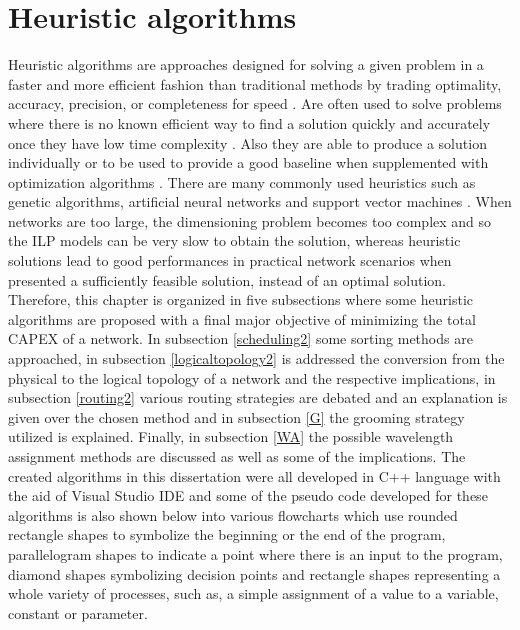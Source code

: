 \chapter{Heuristic algorithms}
\label{chapter5}

Heuristic algorithms are approaches designed for solving a given problem in a faster and more efficient fashion than traditional methods by trading optimality, accuracy, precision, or completeness for speed \cite{HeuristicsDefinition}. Are often used to solve problems where there is no known efficient way to find a solution quickly and accurately once they have low time complexity \cite{HeuristicsDefinition}. Also they are able to produce a solution individually or to be used to provide a good baseline when supplemented with optimization algorithms \cite{articleHeuristics}. There are many commonly used heuristics such as genetic algorithms, artificial neural networks and support vector machines \cite{HeuristicsDefinition}. When networks are too large, the dimensioning problem becomes too complex and so the ILP models can be very slow to obtain the solution, whereas heuristic solutions lead to good performances in practical network scenarios when presented a sufficiently feasible solution, instead of an optimal solution. Therefore, this chapter is organized in five subsections where some heuristic algorithms are proposed with a final major objective of minimizing the total CAPEX of a network. In subsection \ref{scheduling2} some sorting methods are approached, in subsection \ref{logicaltopology2} is addressed the conversion from the physical to the logical topology of a network and the respective implications, in subsection \ref{routing2} various routing strategies are debated and an explanation is given over the chosen method and in subsection \ref{G} the grooming strategy utilized is explained. Finally, in subsection \ref{WA} the possible wavelength assignment methods are discussed as well as some of the implications. The created algorithms in this dissertation were all developed in C++ language with the aid of Visual Studio IDE and some of the pseudo code developed for these algorithms is also shown below into various flowcharts which use rounded rectangle shapes to symbolize the beginning or the end of the program, parallelogram shapes to indicate a point where there is an input to the program, diamond shapes symbolizing decision points and rectangle shapes representing a whole variety of processes, such as, a simple assignment of a value to a variable, constant or parameter.

